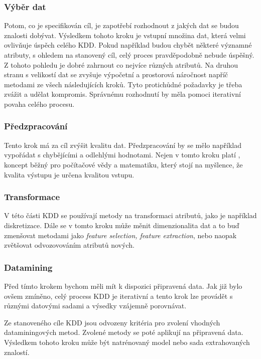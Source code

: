 \documentclass[thesis=M,czech]{FITthesis}[2012/06/26]
\begin{document}
\subsubsection*{Výběr dat}
Potom, co je specifikován cíl, je zapotřebí rozhodnout z jakých dat se budou znalosti dobývat. 
Výsledkem tohoto kroku je vstupní množina dat, která velmi ovlivňuje úspěch celého KDD. Pokud například budou chybět některé významné atributy, s ohledem na stanovený cíl, celý proces pravděpodobně nebude úspěšný. Z tohoto pohledu je dobré zahrnout co nejvíce různých atributů. Na druhou stranu s velikostí dat se zvyšuje výpočetní a prostorová náročnost napříč metodami ze všech následujících kroků. Tyto protichůdné požadavky je třeba zvážit a udělat kompromis. Správnému rozhodnutí by měla pomoci iterativní povaha celého procesu.

\subsubsection*{Předzpracování}
Tento krok má za cíl zvýšit kvalitu dat. Předzpracování by se mělo například vypořádat s chybějícími a odlehlými hodnotami. Nejen v tomto kroku platí , koncept běžný pro počítačové vědy a matematiku, který stojí na myšlence, že kvalita výstupu je určena kvalitou vstupu\cite{g_in_g_out}.

\subsubsection*{Transformace }
\label{subsec:transformace}

V této části KDD se používají metody na transformaci atributů, jako je například diskretizace. Dále se v tomto kroku může měnit dimenzionalita dat a to buď zmenšovat metodami jako \textit{feature selection, feature extraction}, nebo naopak zvětšovat odvozovováním atributů nových. 


\subsubsection*{Datamining}
Před tímto krokem bychom měli mít k dispozici připravená data. Jak již bylo ovšem zmíněno, celý process KDD je iterativní a tento krok lze provádět s různými datovými sadami a výsedky vzájemně porovnávat.

Ze stanoveného cíle KDD jsou odvozeny kritéria pro zvolení vhodných dataminingových metod. Zvolené metody se poté aplikují na připravená data. Výsledkem tohoto kroku může být natrénovaný model nebo sada extrahovaných znalostí.
\end{document}
